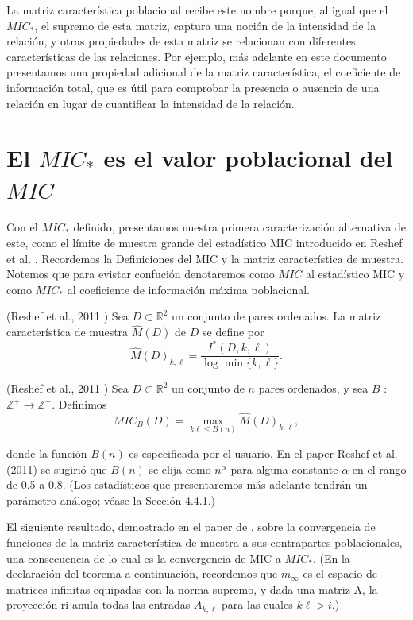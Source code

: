 	
	La matriz caracter\'istica poblacional recibe este nombre porque, al igual que el $MIC_*$, el supremo de esta matriz, captura una noci\'on de la intensidad de la relaci\'on, y otras propiedades de esta matriz se relacionan con diferentes caracter\'isticas de las relaciones. Por ejemplo, m\'as adelante en este documento presentamos una propiedad adicional de la matriz caracter\'istica, el coeficiente de informaci\'on total, que es \'util para comprobar la presencia o ausencia de una relaci\'on en lugar de cuantificar la intensidad de la relaci\'on.

	\section[]{El $MIC_*$ es el valor poblacional del $MIC$}

	Con el $MIC_*$ definido, presentamos nuestra primera caracterizaci\'on alternativa de este, como el l\'imite de muestra grande del estad\'istico MIC introducido en Reshef et al. \cite{Reshef2011}. Recordemos la Definiciones del MIC y la matriz caracter\'istica de muestra. Notemos que para evistar confuci\'on denotaremos como $MIC$ al estad\'istico MIC y como $MIC_*$ al coeficiente de informaci\'on m\'axima poblacional.

	\begin{defn}
		(Reshef et al., 2011 \cite{Reshef2011})  Sea $D \subset \mathbb{R}^2$ un conjunto de pares ordenados. La matriz caracter\'istica de muestra $\widehat{M}(D)$ de $D$ se define por
		$$
		\widehat{M}(D)_{k, \ell}=\frac{I^*(D, k, \ell)}{\log \min \{k, \ell\}} .
		$$
	\end{defn}

	\begin{defn}
		(Reshef et al., 2011 \cite{Reshef2011}) Sea $D \subset \mathbb{R}^2$ un conjunto de $n$ pares ordenados, y sea $B$ : $\mathbb{Z}^{+} \rightarrow \mathbb{Z}^{+}$. Definimos
		$$
		M I C_B(D)=\max _{k \ell \leq B(n)} \widehat{M}(D)_{k, \ell},
		$$
	\end{defn}

	donde la funci\'on $B(n)$ es especificada por el usuario. En el paper Reshef et al. (2011) \cite{Reshef2011} se sugiri\'o que $B(n)$ se elija como $n^\alpha$ para alguna constante $\alpha$ en el rango de 0.5 a 0.8. (Los estad\'isticos que presentaremos m\'as adelante tendr\'an un par\'ametro an\'alogo; v\'ease la Secci\'on 4.4.1.)

	El siguiente resultado, demostrado en el paper de \cite{Reshef2016}, sobre la convergencia de funciones de la matriz caracter\'istica de muestra a sus contrapartes poblacionales, una consecuencia de lo cual es la convergencia de MIC a $MIC_*$. (En la declaraci\'on del teorema a continuaci\'on, recordemos que $m_\infty$ es el espacio de matrices infinitas equipadas con la norma supremo, y dada una matriz A, la proyecci\'on ri anula todas las entradas $A_{k, \ell}$ para las cuales $k\ell > i.$)

